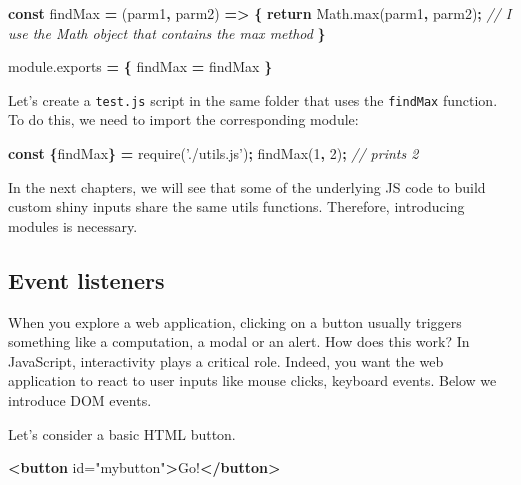 \documentclass[]{book}
\newenvironment{Shaded}{\begin{snugshade}}{\end{snugshade}}
\newcommand{\AttributeTok}[1]{\textcolor[rgb]{0.77,0.63,0.00}{#1}}
\newcommand{\CommentTok}[1]{\textcolor[rgb]{0.56,0.35,0.01}{\textit{#1}}}
\newcommand{\ControlFlowTok}[1]{\textcolor[rgb]{0.13,0.29,0.53}{\textbf{#1}}}
\newcommand{\DecValTok}[1]{\textcolor[rgb]{0.00,0.00,0.81}{#1}}
\newcommand{\KeywordTok}[1]{\textcolor[rgb]{0.13,0.29,0.53}{\textbf{#1}}}
\newcommand{\NormalTok}[1]{#1}
\newcommand{\OperatorTok}[1]{\textcolor[rgb]{0.81,0.36,0.00}{\textbf{#1}}}
\newcommand{\OtherTok}[1]{\textcolor[rgb]{0.56,0.35,0.01}{#1}}
\newcommand{\StringTok}[1]{\textcolor[rgb]{0.31,0.60,0.02}{#1}}
\newcommand{\VariableTok}[1]{\textcolor[rgb]{0.00,0.00,0.00}{#1}}
\begin{document}
\begin{Shaded}
\begin{Highlighting}[]
\KeywordTok{const}\NormalTok{ findMax }\OperatorTok{=}\NormalTok{ (parm1}\OperatorTok{,}\NormalTok{ parm2) }\OperatorTok{=>} \OperatorTok{\{}
  \ControlFlowTok{return} \VariableTok{Math}\NormalTok{.}\AttributeTok{max}\NormalTok{(parm1}\OperatorTok{,}\NormalTok{ parm2)}\OperatorTok{;} \CommentTok{// I use the Math object that contains the max method}
\OperatorTok{\}}

\VariableTok{module}\NormalTok{.}\AttributeTok{exports} \OperatorTok{=} \OperatorTok{\{}
\NormalTok{  findMax }\OperatorTok{=}\NormalTok{ findMax}
\OperatorTok{\}}
\end{Highlighting}
\end{Shaded}

Let's create a \texttt{test.js} script in the same folder that uses the \texttt{findMax} function. To do this, we need to import the corresponding module:

\begin{Shaded}
\begin{Highlighting}[]
\KeywordTok{const} \OperatorTok{\{}\NormalTok{findMax}\OperatorTok{\}} \OperatorTok{=} \AttributeTok{require}\NormalTok{(}\StringTok{'./utils.js'}\NormalTok{)}\OperatorTok{;}
\AttributeTok{findMax}\NormalTok{(}\DecValTok{1}\OperatorTok{,} \DecValTok{2}\NormalTok{)}\OperatorTok{;} \CommentTok{// prints 2}
\end{Highlighting}
\end{Shaded}

In the next chapters, we will see that some of the underlying JS code to build custom shiny inputs share the same utils functions. Therefore, introducing modules is necessary.

\hypertarget{event-listeners}{%
\subsection{Event listeners}\label{event-listeners}}

When you explore a web application, clicking on a button usually triggers something like a computation, a modal or an alert. How does this work?
In JavaScript, interactivity plays a critical role. Indeed, you want the web application to react to user inputs like mouse clicks, keyboard events. Below we introduce DOM events.

Let's consider a basic HTML button.

\begin{Shaded}
\begin{Highlighting}[]
\KeywordTok{<button}\OtherTok{ id=}\StringTok{"mybutton"}\KeywordTok{>}\NormalTok{Go!}\KeywordTok{</button>}
\end{Highlighting}
\end{Shaded}
\end{document}
